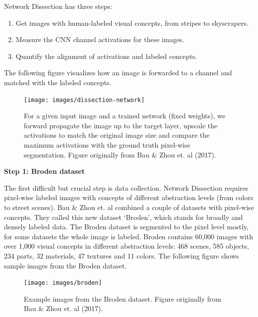 \documentclass[
  12pt,
]{krantz}
\providecommand{\tightlist}{%
  \setlength{\itemsep}{0pt}\setlength{\parskip}{0pt}}
\begin{document}
Network Dissection has three steps:

\begin{enumerate}
\def\labelenumi{\arabic{enumi}.}
\tightlist
\item
  Get images with human-labeled visual concepts, from stripes to skyscrapers.
\item
  Measure the CNN channel activations for these images.
\item
  Quantify the alignment of activations and labeled concepts.
\end{enumerate}

The following figure visualizes how an image is forwarded to a channel and matched with the labeled concepts.

\begin{figure}

{\centering \texttt{[image: images/dissection-network]} 

}

\caption{For a given input image and a trained network (fixed weights), we forward propagate the image up to the target layer, upscale the activations to match the original image size and compare the maximum activations with the ground truth pixel-wise segmentation. Figure originally from Bau \& Zhou et. al (2017).}\label{fig:unnamed-chunk-54}
\end{figure}

\textbf{Step 1: Broden dataset}

The first difficult but crucial step is data collection.
Network Dissection requires pixel-wise labeled images with concepts of different abstraction levels (from colors to street scenes).
Bau \& Zhou et. al combined a couple of datasets with pixel-wise concepts.
They called this new dataset `Broden', which stands for broadly and densely labeled data.
The Broden dataset is segmented to the pixel level mostly, for some datasets the whole image is labeled.
Broden contains 60,000 images with over 1,000 visual concepts in different abstraction levels: 468 scenes, 585 objects, 234 parts, 32 materials, 47 textures and 11 colors.
The following figure shows sample images from the Broden dataset.

\begin{figure}

{\centering \texttt{[image: images/broden]} 

}

\caption{Example images from the Broden dataset. Figure originally from Bau \& Zhou et. al (2017).}\label{fig:unnamed-chunk-55}
\end{figure}
\end{document}
